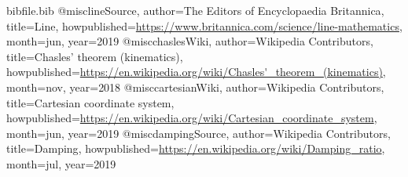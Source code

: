 \documentclass[12pt]{article}
\begin{document}
\begin{filecontents*}{bibfile.bib}
@misc{lineSource,
author={The Editors of Encyclopaedia Britannica},
title={Line},
howpublished={\url{https://www.britannica.com/science/line-mathematics}},
month=jun,
year={2019}}
@misc{chaslesWiki,
author={Wikipedia Contributors},
title={Chasles' theorem (kinematics)},
howpublished={\url{https://en.wikipedia.org/wiki/Chasles'\_theorem\_(kinematics)}},
month=nov,
year={2018}}
@misc{cartesianWiki,
author={Wikipedia Contributors},
title={Cartesian coordinate system},
howpublished={\url{https://en.wikipedia.org/wiki/Cartesian\_coordinate\_system}},
month=jun,
year={2019}}
@misc{dampingSource,
author={Wikipedia Contributors},
title={Damping},
howpublished={\url{https://en.wikipedia.org/wiki/Damping\_ratio}},
month=jul,
year={2019}}
\end{filecontents*}
\nocite{*}
\printbibliography[heading=none]
\end{document}
